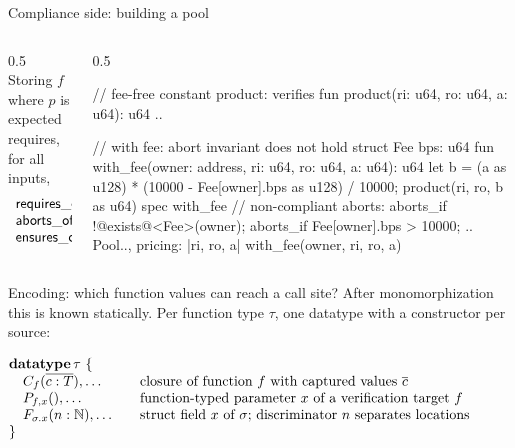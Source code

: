 \documentclass[aspectratio=169,11pt]{beamer}
\begin{document}
\begin{frame}[fragile]{Compliance side: building a pool}
  \begin{columns}[c]
    \begin{column}{0.5\textwidth}
      Storing $f$ where $p$ is expected requires, for all inputs,
      \[
        \begin{array}{l}
          \mathop{\mathstrut{\mathsf{requires\_of}}}\nolimits\langle p\rangle(\bar x) \Rightarrow \mathop{\mathstrut{\mathsf{requires\_of}}}\nolimits\langle f\rangle(\bar x) \\
          \mathop{\mathstrut{\mathsf{aborts\_of}}}\nolimits\langle f\rangle(\bar x) \Leftrightarrow \mathop{\mathstrut{\mathsf{aborts\_of}}}\nolimits\langle p\rangle(\bar x) \\
          \mathop{\mathstrut{\mathsf{ensures\_of}}}\nolimits\langle f\rangle(\bar x,\bar y) \Rightarrow \mathop{\mathstrut{\mathsf{ensures\_of}}}\nolimits\langle p\rangle(\bar x,\bar y)
        \end{array}
      \]
    \end{column}
    \begin{column}{0.5\textwidth}
\begin{MoveSmall}
// fee-free constant product: verifies
fun product(ri: u64, ro: u64, a: u64): u64 { .. }

// with fee: abort invariant does not hold
struct Fee {bps: u64}
fun with_fee(owner: address,
             ri: u64, ro: u64, a: u64): u64 {
  let b = (a as u128)
    * (10000 - Fee[owner].bps as u128) / 10000;
  product(ri, ro, b as u64)
}
spec with_fee {
  // non-compliant aborts:
  aborts_if !@{\color{mBlue}exists}@<Fee>(owner);
  aborts_if Fee[owner].bps > 10000; ..
}
Pool{..,
  pricing: |ri, ro, a| with_fee(owner, ri, ro, a)}
\end{MoveSmall}
    \end{column}
  \end{columns}
\end{frame}


\begin{frame}{Encoding: which function values can reach a call site?}
  After monomorphization this is known statically.
  Per function type $\tau$, one datatype with a constructor per source:
  \vspace{1.5ex}
  \begin{center}
  $\begin{array}{@{}l@{\qquad}l@{}}
      \multicolumn{2}{@{}l}{\DATATYPE \tau\ \{} \\
      \quad C_{f}(\sq{c : T}), \ldots & \text{closure of function $f$ with captured values $\sq c$} \\
      \quad P_{f,x}(), \ldots & \text{function-typed parameter $x$ of a verification target $f$} \\
      \quad F_{\sigma.x}(n : \nat), \ldots & \text{struct field $x$ of $\sigma$; discriminator $n$ separates locations} \\
      \multicolumn{2}{@{}l}{\}}
    \end{array}$
  \end{center}
\end{frame}
\end{document}
